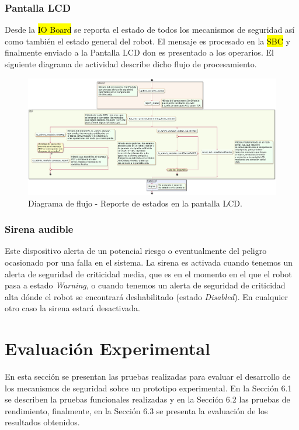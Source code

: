\documentclass[withindex,glossary]{cam-thesis}
\begin{document}
\subsection{Pantalla LCD}
Desde la \hl{IO Board} se reporta el estado de todos los mecanismos de seguridad así como también el estado general del robot. El mensaje es procesado en la \hl{SBC} y finalmente enviado a la Pantalla LCD don es presentado a los operarios. El siguiente diagrama de actividad describe dicho flujo de procesamiento.

\begin{figure}[H]
\centering
\includegraphics[width=\textwidth]{images/Diagrama_de_flujo_indicadores_de_estados}
\caption[Diagrama de flujo - Indicadores de estados, pantalla LCD]{Diagrama de flujo - Reporte de estados en la pantalla LCD.}
\label{fig: Diagrama de flujo - Indicadores de estados Pantalla LCD}
\end{figure}

\subsection{Sirena audible}
Este dispositivo alerta de un potencial riesgo o eventualmente del peligro ocasionado por una falla en el sistema.
La sirena es activada cuando tenemos un alerta de seguridad de criticidad media, que es en el momento en el que el robot pasa a estado \textit{Warning}, o cuando tenemos un alerta de seguridad de criticidad alta dónde el robot se encontrará deshabilitado (estado \textit{Disabled}). En cualquier otro caso la sirena estará desactivada.
 
\chapter{Evaluación Experimental}
En esta sección se presentan las pruebas realizadas para evaluar el desarrollo de los mecanismos de seguridad sobre un prototipo experimental. En la Sección 6.1 se describen la pruebas funcionales realizadas y en la Sección 6.2 las pruebas de rendimiento, finalmente, en la Sección 6.3 se presenta la evaluación de los resultados obtenidos.
\end{document}
